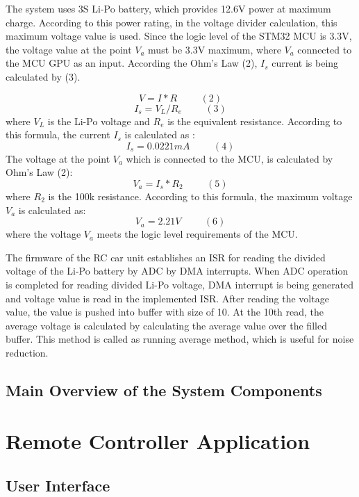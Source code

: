 The system uses 3S Li-Po battery, which provides 12.6V power at maximum charge. According to this power rating, in the voltage divider calculation, this maximum voltage value is used. Since the logic level of the STM32 MCU is 3.3V, the voltage value at the point $V_a$ must be 3.3V maximum, where $V_a$ connected to the MCU GPU as an input. According  the Ohm's Law (2), $I_s$ current is being calculated by (3).

\[V = I*R \hspace{1cm}(2)\]
\[I_s = V_L / R_e \hspace{1cm}(3)\] where $V_L$ is the Li-Po voltage and $R_e$ is the equivalent resistance. According to this formula, the current $I_s$ is calculated as :
\[I_s = 0.0221mA\hspace{1cm}(4)\]
The voltage at the point $V_a$ which is connected to the MCU, is calculated by Ohm's Law (2):
\[V_a = I_s*R_2 \hspace{1cm}(5)\] where $R_2$ is the 100k resistance. According to this formula, the maximum voltage $V_a$ is calculated as:
\[V_a = 2.21V\hspace{1cm}(6)\]
where the voltage $V_a$ meets the logic level requirements of the MCU. 

The firmware of the RC car unit establishes an ISR for reading the divided voltage of the Li-Po battery by ADC by DMA interrupts. When ADC operation is completed for reading divided Li-Po voltage, DMA interrupt is being generated and voltage value is read in the implemented ISR. After reading the voltage value, the value is pushed into buffer with size of 10. At the 10th read,  the average voltage is calculated by calculating the average value over the filled buffer. This method is called as running average method, which is useful for noise reduction.


\subsection{Main Overview of the System Components} \label{main_system_components}

\section{Remote Controller Application} \label{sec_remote_app}

\subsection{User Interface} \label{sec_user_interface}


